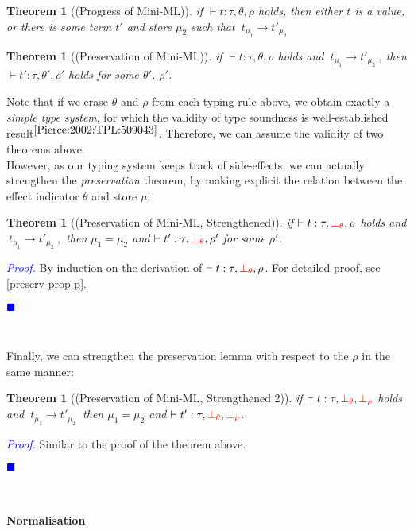 \documentclass[a4paper,11pt,oneside]{article}
\theoremstyle{plain}
\newtheorem{theorem}[definition]{Theorem}
\renewenvironment{proof}{\noindent \textcolor{blue}{\textit{Proof.}}}
{{\begin{tiny}\textcolor{blue}{$\blacksquare$}\end{tiny}}\\}
\newcommand{\bth}{\bot_\theta}
\newcommand{\brh}{\bot_\rho}
\newcommand{\evalstep}[4]{~#1_{\mu_#2} \rightarrow #3_{\mu_#4} ~}
\begin{document}
\begin{theorem}[(Progress of Mini-ML)] 
if $\vdash t : \tau, \theta, \rho$ holds, then either $t$ is a value, or
there is some term $t'$ and store $\mu_2$ such that 
$\evalstep{t}{1}{t'}{2}$
\end{theorem}

\begin{theorem}[(Preservation of Mini-ML)] 
if $\vdash t : \tau, \theta, \rho$ holds and $\evalstep{t}{1}{t'}{2}$, then 
$\vdash t' : \tau, \theta', \rho'$ holds for some $\theta'$, $\rho'$.
\end{theorem}
	
 Note that if we erase $\theta$ and $\rho$ from each typing rule above, we obtain exactly a \textit{simple type system}, for which the validity of type soundness is well-established result{\footnotesize$^{ \cite[p.~190]{Pierce:2002:TPL:509043}}$}. Therefore, we can assume the validity of two theorems above. \\
	 	
 However, as our typing system keeps track of side-effects, we can actually strengthen the \textit{preservation} theorem, by making explicit the relation between the effect indicator $\theta$  and store $\mu$:
 
\begin{theorem}[(Preservation of Mini-ML, Strengthened)] 
if $\vdash t : \tau, \textcolor{red}{\bth}, \rho$ holds and $\evalstep{t}{1}{t'}{2},$ then $\mu_1 = \mu_2$ and $\vdash t' : \tau, \textcolor{red}{\bth}, \rho'$ for some $\rho'$.
\label{preserv-prop-d}
\end{theorem}
\begin{proof}
  By induction on the derivation of $\vdash t : \tau, \textcolor{red}{\bth}, \rho$.
  For detailed proof, see \ref{preserv-prop-p}. 
\end{proof}

Finally, we can strengthen the preservation lemma with respect to the $\rho$ in the same manner:
\begin{theorem}[(Preservation of Mini-ML, Strengthened 2)] 
if $\vdash t : \tau, \textcolor{red}{\bth}, \textcolor{red}{\brh}$ holds and $\evalstep{t}{1}{t'}{2}$ then $\mu_1 = \mu_2$ and $\vdash t' : \tau, \textcolor{red}{\bth}, \textcolor{red}{\brh}$.
\label{preserv-prop2-d}
\end{theorem}
\begin{proof}
  Similar to the proof of the theorem above.
\end{proof}
\paragraph{Normalisation}
\end{document}
